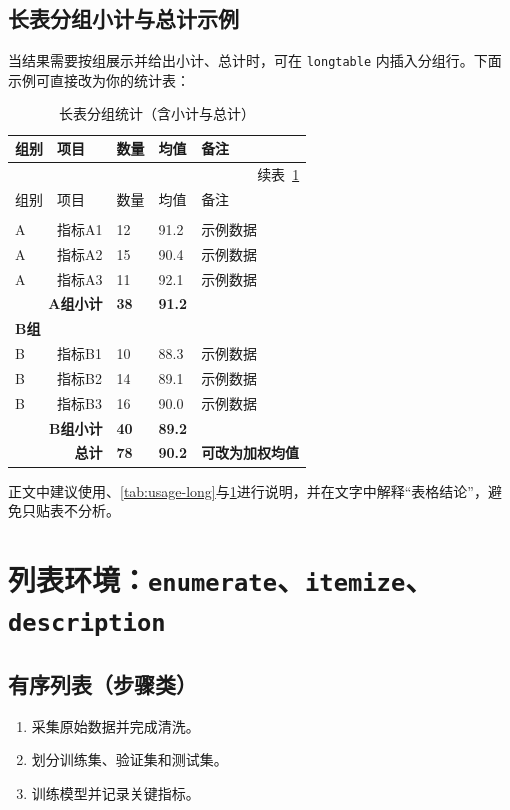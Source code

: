 \subsection{长表分组小计与总计示例}

当结果需要按组展示并给出小计、总计时，可在 \verb|longtable| 内插入分组行。下面示例可直接改为你的统计表：

\begin{longtable}{p{2cm}p{4cm}p{2cm}p{2cm}p{2cm}}
  \caption{长表分组统计（含小计与总计）}\label{tab:usage-long-sum}\\
  \toprule
  组别 & 项目 & 数量 & 均值 & 备注 \\
  \midrule
  \endfirsthead
  \multicolumn{5}{r}{续表~\ref{tab:usage-long-sum}}\\
  \toprule
  组别 & 项目 & 数量 & 均值 & 备注 \\
  \midrule
  \endhead
  \bottomrule
  \endfoot
  \bottomrule
  \endlastfoot
  \multicolumn{5}{l}{\textbf{A组}}\\
  A & 指标A1 & 12 & 91.2 & 示例数据\\
  A & 指标A2 & 15 & 90.4 & 示例数据\\
  A & 指标A3 & 11 & 92.1 & 示例数据\\
  \midrule
  \multicolumn{2}{r}{\textbf{A组小计}} & \textbf{38} & \textbf{91.2} & \\
  \midrule
  \multicolumn{5}{l}{\textbf{B组}}\\
  B & 指标B1 & 10 & 88.3 & 示例数据\\
  B & 指标B2 & 14 & 89.1 & 示例数据\\
  B & 指标B3 & 16 & 90.0 & 示例数据\\
  \midrule
  \multicolumn{2}{r}{\textbf{B组小计}} & \textbf{40} & \textbf{89.2} & \\
  \midrule
  \multicolumn{2}{r}{\textbf{总计}} & \textbf{78} & \textbf{90.2} & \textbf{可改为加权均值}\\
\end{longtable}

正文中建议使用、\cref{tab:usage-long}与\cref{tab:usage-long-sum}进行说明，并在文字中解释“表格结论”，避免只贴表不分析。

\section{列表环境：\texttt{enumerate}、\texttt{itemize}、\texttt{description}}

\subsection{有序列表（步骤类）}
\begin{enumerate}
  \item 采集原始数据并完成清洗。
  \item 划分训练集、验证集和测试集。
  \item 训练模型并记录关键指标。
\end{enumerate}

